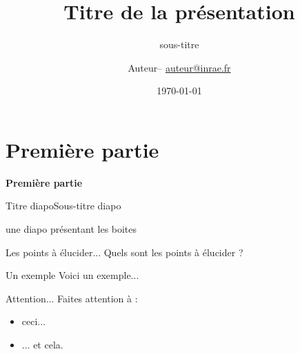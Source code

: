 \documentclass[11pt,aspectratio=169]{beamer}
\author[Auteur]{Auteur--
\href{mailto:auteur@inrae.fr}{auteur@inrae.fr}
}
\title[Titre court]{Titre de la présentation}
\subtitle{sous-titre}
\institute[UR]{UR -- Déroulé acronyme}
\date[\today]{\today}
\begin{document}
\begin{frame}[plain]
\titlepage
\end{frame}

\begin{frame}[plain]
\tableofcontents
\end{frame}


\section{Première partie}
\begin{frame}[plain]{}
	\begin {center}
		\textcolor{inraefonce}{\textbf{{\Large Première partie}}}
	\end{center}
\end{frame}

\begin{frame}{Titre diapo}{Sous-titre diapo}

\end{frame}


\begin{frame}{une diapo présentant les boites}
\begin{block}{Les points à élucider...}
Quels sont les points à élucider ?
\end{block}

\begin{exampleblock}{Un exemple}
Voici un exemple...
\end{exampleblock}

\begin{alertblock}{Attention...}
Faites attention à :
\begin{itemize}
\item ceci...
\item ... et cela.
\end{itemize}
\end{alertblock}
\end{frame}
\end{document}
